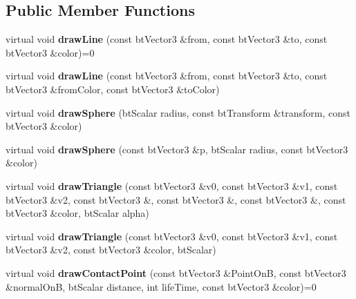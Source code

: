 \subsection*{Public Member Functions}
\begin{DoxyCompactItemize}
\item 
\hypertarget{classbt_i_debug_draw_a07b08e255ab4607ab5aeb24399332aff}{virtual void {\bfseries draw\+Line} (const bt\+Vector3 \&from, const bt\+Vector3 \&to, const bt\+Vector3 \&color)=0}\label{classbt_i_debug_draw_a07b08e255ab4607ab5aeb24399332aff}

\item 
\hypertarget{classbt_i_debug_draw_a0e9e92ccb0b2eec9c2fc8792a286af9a}{virtual void {\bfseries draw\+Line} (const bt\+Vector3 \&from, const bt\+Vector3 \&to, const bt\+Vector3 \&from\+Color, const bt\+Vector3 \&to\+Color)}\label{classbt_i_debug_draw_a0e9e92ccb0b2eec9c2fc8792a286af9a}

\item 
\hypertarget{classbt_i_debug_draw_a29033d7c4f7d8c1745301bc4b5253f3b}{virtual void {\bfseries draw\+Sphere} (bt\+Scalar radius, const bt\+Transform \&transform, const bt\+Vector3 \&color)}\label{classbt_i_debug_draw_a29033d7c4f7d8c1745301bc4b5253f3b}

\item 
\hypertarget{classbt_i_debug_draw_a49e2bf7b122f241b7b29913888d6825b}{virtual void {\bfseries draw\+Sphere} (const bt\+Vector3 \&p, bt\+Scalar radius, const bt\+Vector3 \&color)}\label{classbt_i_debug_draw_a49e2bf7b122f241b7b29913888d6825b}

\item 
\hypertarget{classbt_i_debug_draw_a3f0eec1b40109254182f0fe35f6308d0}{virtual void {\bfseries draw\+Triangle} (const bt\+Vector3 \&v0, const bt\+Vector3 \&v1, const bt\+Vector3 \&v2, const bt\+Vector3 \&, const bt\+Vector3 \&, const bt\+Vector3 \&, const bt\+Vector3 \&color, bt\+Scalar alpha)}\label{classbt_i_debug_draw_a3f0eec1b40109254182f0fe35f6308d0}

\item 
\hypertarget{classbt_i_debug_draw_ae537cc49a9061703ec1f1be33cf24ea3}{virtual void {\bfseries draw\+Triangle} (const bt\+Vector3 \&v0, const bt\+Vector3 \&v1, const bt\+Vector3 \&v2, const bt\+Vector3 \&color, bt\+Scalar)}\label{classbt_i_debug_draw_ae537cc49a9061703ec1f1be33cf24ea3}

\item 
\hypertarget{classbt_i_debug_draw_a791eba72577f83519499bd646bb4a3f1}{virtual void {\bfseries draw\+Contact\+Point} (const bt\+Vector3 \&Point\+On\+B, const bt\+Vector3 \&normal\+On\+B, bt\+Scalar distance, int life\+Time, const bt\+Vector3 \&color)=0}\label{classbt_i_debug_draw_a791eba72577f83519499bd646bb4a3f1}


\end{DoxyCompactItemize}
